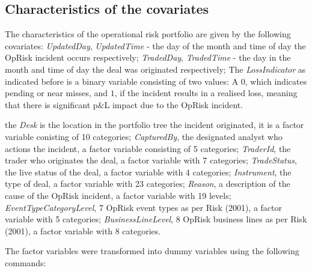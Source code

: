 \documentclass[]{DissertateUSU}
\begin{document}
\subsection{Characteristics of the covariates}

The characteristics of the operational risk portfolio are given by the
following covariates: \emph{UpdatedDay}, \emph{UpdatedTime} - the day of
the month and time of day the OpRisk incident occurs respectively;
\emph{TradedDay}, \emph{TradedTime} - the day in the month and time of
day the deal was originated respectively; The \emph{LossIndicator} as
indicated before is a binary variable consisting of two values: A \(0\),
which indicates pending or near misses, and \(1\), if the incident
results in a realised loss, meaning that there is significant p\&L
impact due to the OpRisk incident.\medskip

the \emph{Desk} is the location in the portfolio tree the incident
originated, it is a factor variable conisting of 10 categories;
\emph{CapturedBy}, the designated analyst who actions the incident, a
factor variable consisting of 5 categories; \emph{TraderId}, the trader
who originates the deal, a factor variable with 7 categories;
\emph{TradeStatus}, the live status of the deal, a factor variable with
4 categories; \emph{Instrument}, the type of deal, a factor variable
with 23 categories; \emph{Reason}, a description of the cause of the
OpRisk incident, a factor variable with 19 levels;
\emph{EventTypeCategoryLevel}, 7 OpRisk event types as per Risk (2001),
a factor variable with 5 categories; \emph{BusinessLineLevel}, 8 OpRisk
business lines as per Risk (2001), a factor variable with 8
categories.\medskip

The factor variables were transformed into dummy variables using the
following commands: \singlespacing
\end{document}
